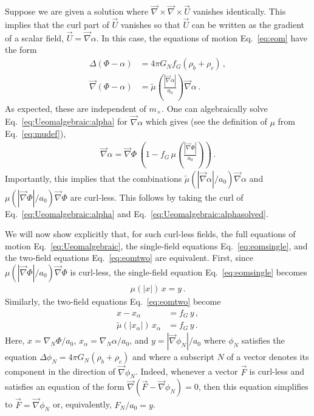 \documentclass[reprint, amsmath,amssymb, nofootinbib, aps, prd]{revtex4-2}
\begin{document}
Suppose we are given a solution where $\vec{\nabla} \times \vec{\nabla} \times \vec{U}$ vanishes identically.
This implies that the curl part of $\vec{U}$ vanishes so that $\vec{U}$ can be written as the gradient of a scalar field, $\vec{U} = \vec{\nabla} \alpha$.
In this case, the equations of motion Eq.~\eqref{eq:eom} have the form
\begin{subequations}
\label{eq:Ueomalgebraic}
\begin{align}
 \label{eq:Ueomalgebraic:Phi}
 \Delta (\Phi - \alpha) &= 4 \pi G_N f_G (\rho_b + \rho_c) \,, \\
 \label{eq:Ueomalgebraic:alpha}
 \vec{\nabla} (\Phi - \alpha) &= \tilde{\mu}\left(\frac{|\vec{\nabla} \alpha|}{a_0}\right) \vec{\nabla} \alpha \,.
\end{align}
\end{subequations}
As expected, these are independent of $m_\times$.
One can algebraically solve Eq.~\eqref{eq:Ueomalgebraic:alpha} for $\vec{\nabla} \alpha$ which gives (see the definition of $\mu$ from Eq.~\eqref{eq:mudef}),
\begin{align}
 \label{eq:Ueomalgebraic:alphasolved}
 \vec{\nabla} \alpha = \vec{\nabla} \Phi \,\left(1 - f_G\,\mu\left(\frac{|\vec{\nabla} \Phi|}{a_0}\right)\right) \,.
\end{align}
Importantly, this implies that the combinations $\tilde{\mu}(|\vec{\nabla} \alpha|/a_0) \vec{\nabla} \alpha$ and $\mu(|\vec{\nabla} \Phi|/a_0) \vec{\nabla} \Phi$ are curl-less.
This follows by taking the curl of Eq.~\eqref{eq:Ueomalgebraic:alpha} and Eq.~\eqref{eq:Ueomalgebraic:alphasolved}.

We will now show explicitly that, for such curl-less fields, the full equations of motion Eq.~\eqref{eq:Ueomalgebraic}, the single-field equations Eq.~\eqref{eq:eomsingle}, and the two-field equations Eq.~\eqref{eq:eomtwo} are equivalent.
First, since $\mu(|\vec{\nabla} \Phi|/a_0) \vec{\nabla} \Phi$ is curl-less, the single-field equation Eq.~\eqref{eq:eomsingle} becomes
\begin{align}
 \label{eq:algebraic:single}
 \mu(|x|) \, x = y \,.
\end{align}
Similarly, the two-field equations Eq.~\eqref{eq:eomtwo} become
\begin{subequations}
 \label{eq:algebraic:two}
\begin{align}
 \label{eq:algebraic:two:Newton}
 x - x_\alpha &= f_G \, y \,, \\
 \label{eq:algebraic:two:MOND}
 \tilde{\mu}(|x_\alpha|) \, x_\alpha &= f_G \, y \,.
\end{align}
\end{subequations}
Here, $x = \nabla_N \Phi/a_0$, $x_\alpha = \nabla_N \alpha/a_0$, and $y = |\vec{\nabla} \phi_N|/a_0$ where $\phi_N$ satisfies the equation $\Delta \phi_N = 4 \pi G_N (\rho_b + \rho_c)$ and where a subscript $N$ of a vector denotes its component in the direction of $\vec{\nabla} \phi_N$.
Indeed, whenever a vector $\vec{F}$ is curl-less and satisfies an equation of the form $\vec{\nabla} (\vec{F} - \vec{\nabla} \phi_N) = 0$, then this equation simplifies to $\vec{F} = \vec{\nabla} \phi_N$ or, equivalently, $F_N/a_0 = y$.
\end{document}
